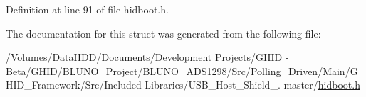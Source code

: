 \-Definition at line 91 of file hidboot.\-h.



\-The documentation for this struct was generated from the following file\-:\begin{DoxyCompactItemize}
\item 
/\-Volumes/\-Data\-H\-D\-D/\-Documents/\-Development Projects/\-G\-H\-I\-D -\/ Beta/\-G\-H\-I\-D/\-B\-L\-U\-N\-O\-\_\-\-Project/\-B\-L\-U\-N\-O\-\_\-\-A\-D\-S1298/\-Src/\-Polling\-\_\-\-Driven/\-Main/\-G\-H\-I\-D\-\_\-\-Framework/\-Src/\-Included Libraries/\-U\-S\-B\-\_\-\-Host\-\_\-\-Shield\-\_.-\/master/\hyperlink{hidboot_8h}{hidboot.\-h}\end{DoxyCompactItemize}
